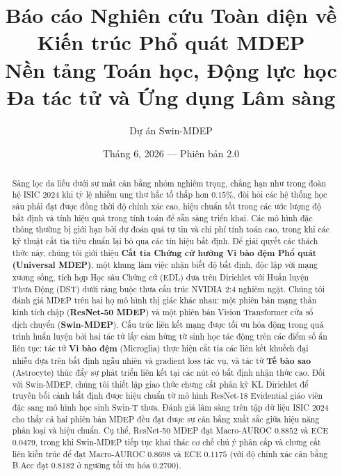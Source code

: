 \documentclass[11pt, a4paper]{article}
\title{
    \textbf{Báo cáo Nghiên cứu Toàn diện về Kiến trúc Phổ quát MDEP} \\[6pt]
    \large Nền tảng Toán học, Động lực học Đa tác tử và Ứng dụng Lâm sàng
}
\author{Dự án Swin-MDEP}
\date{Tháng 6, 2026 --- Phiên bản 2.0}
\begin{document}
\maketitle

\begin{abstract}
Sàng lọc da liễu dưới sự mất cân bằng nhóm nghiêm trọng, chẳng hạn như trong đoàn hệ ISIC 2024 khi tỷ lệ nhiễm ung thư hắc tố thấp hơn $0.15\%$, đòi hỏi các hệ thống học sâu phải đạt được đồng thời độ chính xác cao, hiệu chuẩn tốt trong các ước lượng độ bất định và tính hiệu quả trong tính toán để sẵn sàng triển khai. Các mô hình đặc thông thường bị giới hạn bởi dự đoán quá tự tin và chi phí tính toán cao, trong khi các kỹ thuật cắt tỉa tiêu chuẩn lại bỏ qua các tín hiệu bất định. Để giải quyết các thách thức này, chúng tôi giới thiệu \textbf{Cắt tỉa Chứng cứ hướng Vi bào đệm Phổ quát (Universal MDEP)}, một khung làm việc nhận biết độ bất định, độc lập với mạng xương sống, tích hợp Học sâu Chứng cứ (EDL) dựa trên Dirichlet với Huấn luyện Thưa Động (DST) dưới ràng buộc thưa cấu trúc NVIDIA 2:4 nghiêm ngặt. Chúng tôi đánh giá MDEP trên hai họ mô hình thị giác khác nhau: một phiên bản mạng thần kinh tích chập (\textbf{ResNet-50 MDEP}) và một phiên bản Vision Transformer cửa sổ dịch chuyển (\textbf{Swin-MDEP}). Cấu trúc liên kết mạng được tối ưu hóa động trong quá trình huấn luyện bởi hai tác tử lấy cảm hứng từ sinh học tác động trên các điểm số ẩn liên tục: tác tử \textbf{Vi bào đệm} (Microglia) thực hiện cắt tỉa các liên kết khuếch đại nhiễu dựa trên bất định ngẫu nhiên và gradient loss tác vụ, và tác tử \textbf{Tế bào sao} (Astrocyte) thúc đẩy sự phát triển liên kết tại các nút có bất định nhận thức cao. Đối với Swin-MDEP, chúng tôi thiết lập giao thức chưng cất phân kỳ KL Dirichlet để truyền bối cảnh bất định được hiệu chuẩn từ mô hình ResNet-18 Evidential giáo viên đặc sang mô hình học sinh Swin-T thưa. Đánh giá lâm sàng trên tập dữ liệu ISIC 2024 cho thấy cả hai phiên bản MDEP đều đạt được sự cân bằng xuất sắc giữa hiệu năng phân loại và hiệu chuẩn. Cụ thể, ResNet-50 MDEP đạt Macro-AUROC $0.8852$ và ECE $0.0479$, trong khi Swin-MDEP tiếp tục khai thác cơ chế chú ý phân cấp và chưng cất liên kiến trúc để đạt Macro-AUROC $0.8698$ và ECE $0.1175$ (với độ chính xác cân bằng B.Acc đạt $0.8182$ ở ngưỡng tối ưu hóa $0.2700$).
\end{abstract}

\tableofcontents
\newpage

\end{document}
